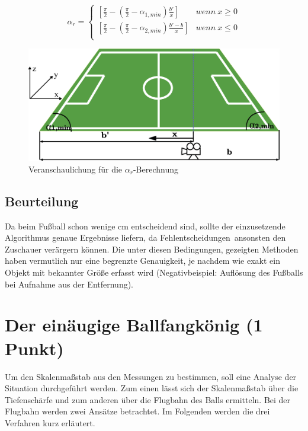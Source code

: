 \documentclass{ezb}
\begin{document}
\begin{equation}
\alpha_{r} = 
\begin{cases}
	[\frac{\pi}{2} - (\frac{\pi}{2}-\alpha_{1,min})\frac{b'}{x}] & wenn \ x\geq 0  \\
    [\frac{\pi}{2} - (\frac{\pi}{2}-\alpha_{2,min})\frac{b'-b}{x}] & wenn \ x\leq 0 \\
\end{cases}
\label{eq:alphar}
\end{equation}
\begin{figure}[!h]
\centering
\includegraphics[scale=0.6]{./ar.eps}
\caption{Veranschaulichung für die $\alpha_{r}$-Berechnung}
\label{abb:alpharBerechnung}
\end{figure}
\subsection{Beurteilung}
Da beim Fußball schon wenige cm entscheidend sind, sollte der einzusetzende Algorithmus genaue Ergebnisse liefern, da \glqq Fehlentscheidungen\grqq \ ansonsten den Zuschauer verärgern können. Die unter diesen Bedingungen, gezeigten Methoden haben vermutlich nur eine begrenzte Genauigkeit, je nachdem wie exakt ein Objekt mit bekannter Größe erfasst wird (Negativbeispiel: Auflösung des Fußballs bei Aufnahme aus der Entfernung).
\section{Der einäugige Ballfangkönig (1 Punkt)}
Um den Skalenmaßstab aus den Messungen zu bestimmen, soll eine Analyse der Situation durchgeführt werden. Zum einen lässt sich der Skalenmaßstab über die Tiefenschärfe und zum anderen über die Flugbahn des Balls ermitteln. Bei der Flugbahn werden zwei Ansätze betrachtet. Im Folgenden werden die drei Verfahren kurz erläutert.
\end{document}
